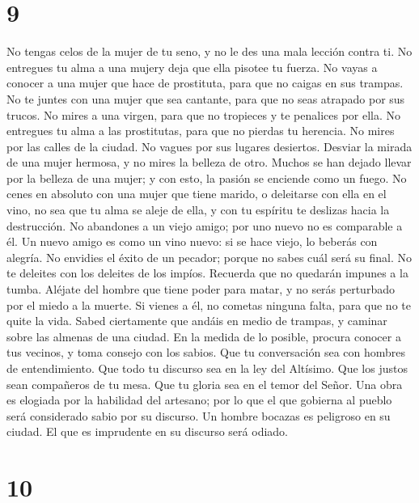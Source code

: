 \hypertarget{section-8}{%
\section{9}\label{section-8}}

 No tengas celos de la mujer de tu seno, y no le des una
mala lección contra ti.  No entregues tu alma a una mujery
deja que ella pisotee tu fuerza.  No vayas a conocer a una
mujer que hace de prostituta, para que no caigas en sus trampas.
 No te juntes con una mujer que sea cantante, para que no
seas atrapado por sus trucos.  No mires a una virgen, para
que no tropieces y te penalices por ella.  No entregues tu
alma a las prostitutas, para que no pierdas tu herencia. 
No mires por las calles de la ciudad. No vagues por sus lugares
desiertos.  Desviar la mirada de una mujer hermosa, y no
mires la belleza de otro. Muchos se han dejado llevar por la belleza de
una mujer; y con esto, la pasión se enciende como un fuego.
 No cenes en absoluto con una mujer que tiene marido, o
deleitarse con ella en el vino, no sea que tu alma se aleje de ella, y
con tu espíritu te deslizas hacia la destrucción.  No
abandones a un viejo amigo; por uno nuevo no es comparable a él. Un
nuevo amigo es como un vino nuevo: si se hace viejo, lo beberás con
alegría.  No envidies el éxito de un pecador; porque no
sabes cuál será su final.  No te deleites con los
deleites de los impíos. Recuerda que no quedarán impunes a la tumba.
 Aléjate del hombre que tiene poder para matar, y no
serás perturbado por el miedo a la muerte. Si vienes a él, no cometas
ninguna falta, para que no te quite la vida. Sabed ciertamente que
andáis en medio de trampas, y caminar sobre las almenas de una ciudad.
 En la medida de lo posible, procura conocer a tus
vecinos, y toma consejo con los sabios.  Que tu
conversación sea con hombres de entendimiento. Que todo tu discurso sea
en la ley del Altísimo.  Que los justos sean compañeros
de tu mesa. Que tu gloria sea en el temor del Señor.  Una
obra es elogiada por la habilidad del artesano; por lo que el que
gobierna al pueblo será considerado sabio por su discurso.
 Un hombre bocazas es peligroso en su ciudad. El que es
imprudente en su discurso será odiado.

\hypertarget{section-9}{%
\section{10}\label{section-9}}

